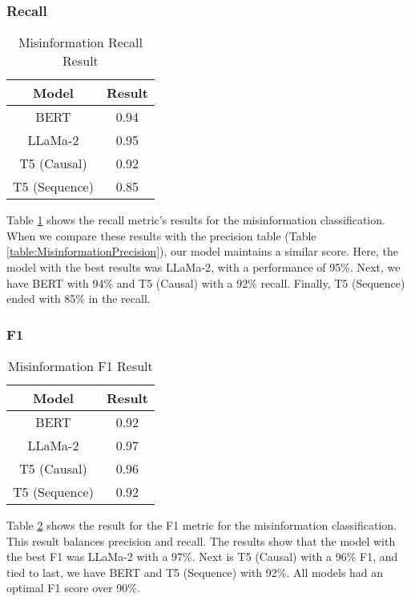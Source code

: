 \subsubsection{Recall}
\begin{table}[H]
	\centering
	\caption{Misinformation Recall Result}
	\begin{tabular}{||c | c||} 
		\hline
		\textbf{Model} & \textbf{Result} \\ [0.5ex] 
		\hline
		BERT & 0.94  \\
		\hline
		LLaMa-2 & 0.95 \\ 
		\hline
		T5 (Causal) & 0.92 \\
		\hline
		T5 (Sequence) & 0.85 \\
		\hline
	\end{tabular}
	\label{table:MisinformationRecall}
\end{table}

Table \ref{table:MisinformationRecall} shows the recall metric's results for the misinformation classification. When we compare these results with the precision table 
(Table \ref{table:MisinformationPrecision}), our model maintains a similar score. Here, the model with the best results was LLaMa-2, with a performance of 95\%.
Next, we have BERT with 94\% and T5 (Causal) with a 92\% recall. Finally, T5 (Sequence) ended with 85\% in the recall.


\subsubsection{F1}
\begin{table}[H]
	\centering
	\caption{Misinformation F1 Result}
	\begin{tabular}{||c | c||} 
		\hline
		\textbf{Model} & \textbf{Result} \\ [0.5ex] 
		\hline
		BERT & 0.92  \\
		\hline
		LLaMa-2 & 0.97 \\ 
		\hline
		T5 (Causal) & 0.96 \\
		\hline
		T5 (Sequence) & 0.92 \\
		\hline
	\end{tabular}
	\label{table:MisinformationF1}
\end{table}


Table \ref{table:MisinformationF1}  shows the result for the F1 metric for the misinformation classification. This result balances precision and recall. The results show that the model
with the best F1 was LLaMa-2 with a 97\%. Next is T5 (Causal) with a 96\% F1, and tied to last, we have BERT and T5 (Sequence) with 92\%. All models had an optimal F1 score over 90\%.


